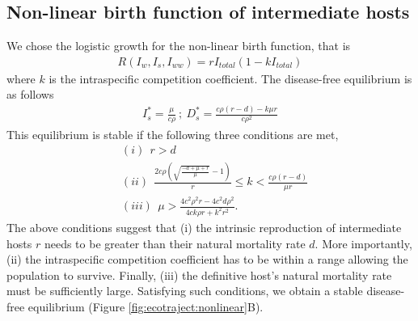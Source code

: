 \documentclass[11pt]{article}
\begin{document}
\subsection*{Non-linear birth function of intermediate hosts}
We chose the logistic growth for the non-linear birth function, that is 
%
\begin{align*}
R(I_w, I_s,I_{ww}) = r I_{total} (1 - k I_{total})
\end{align*}
%
where $k$ is the intraspecific competition coefficient. 
The disease-free equilibrium is as follows
%
\begin{align*}
I_s^* = \frac{\mu}{c \rho } \ ;\  D_s^* = \frac{c \rho  (r-d) - k \mu  r}{c \rho ^2}
\end{align*}
%
This equilibrium is stable if the following three conditions are met,
%
\begin{align*}
& (i)\ \  r > d \\
& (ii)\ \  \frac{2 c \rho  \left(\sqrt{\frac{-d+\mu +r}{\mu }}-1\right)}{r}\leq  k < \frac{c \rho  (r-d)}{\mu  r} \\
& (iii)\ \  \mu  >\frac{4 c^2 \rho ^2 r - 4 c^2 d \rho ^2}{4 c k \rho r + k^2 r^2}.
\end{align*}
%
The above conditions suggest that (i) the intrinsic reproduction of intermediate hosts $r$ needs to be greater than their natural mortality rate $d$. 
More importantly, (ii) the intraspecific competition coefficient has to be within a range allowing the population to survive.
Finally, (iii) the definitive host's natural mortality rate must be sufficiently large. 
Satisfying such conditions, we obtain a stable disease-free equilibrium (Figure \ref{fig:ecotraject:nonlinear}B).
\end{document}
